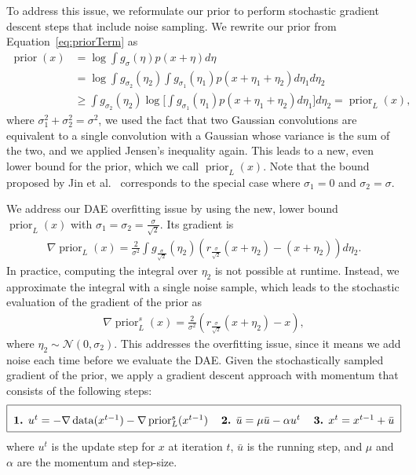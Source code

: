 \documentclass{article}
\DeclareMathOperator*{\data}{data}
\DeclareMathOperator*{\prior}{prior}
\begin{document}
To address this issue, we reformulate our prior to perform stochastic gradient descent steps that include noise sampling. We rewrite our prior from Equation~\eqref{eq:priorTerm} as
\begin{align}
\prior(x) &= \log \int g_{\sigma}(\eta) p(x+\eta) d\eta \\
&= \log \int g_{\sigma_2}(\eta_2) \int g_{\sigma_1}(\eta_1) p(x+\eta_1+\eta_2) d\eta_1 d\eta_2 \\
&\geq \int g_{\sigma_2}(\eta_2) \log \Bigg[ \int g_{\sigma_1}(\eta_1) p(x+\eta_1+\eta_2) d\eta_1 \Bigg] d\eta_2 = {\prior}_L(x),
\end{align}
where $\sigma_1^2 + \sigma_2^2 = \sigma^2$, we used the fact that two Gaussian convolutions are equivalent to a single convolution with a Gaussian whose variance is the sum of the two, and we applied Jensen's inequality again. This leads to a new, even lower bound for the prior, which we call $\prior_L(x)$. Note that the bound proposed by Jin et al.~\cite{Jin:2017:NBD} corresponds to the special case where $\sigma_1=0$ and $\sigma_2=\sigma$.

We address our DAE overfitting issue by using the new, lower bound $\prior_L(x)$ with $\sigma_1=\sigma_2=\frac{\sigma}{\sqrt{2}}$. Its gradient is
\begin{align}
\nabla {\prior}_L(x)  
= \frac{2}{\sigma^2} \int g_{\frac{\sigma}{\sqrt{2}}}(\eta_2) \left(r_{\frac{\sigma}{\sqrt{2}}}(x+\eta_2)-(x+\eta_2)\right) d\eta_2.
\end{align}
In practice, computing the integral over $\eta_2$ is not possible at runtime. Instead, we approximate the integral with a single noise sample, which leads to the stochastic evaluation of the gradient of the prior as
\begin{align}
\nabla {\prior}_L^s(x) = \frac{2}{\sigma^2} \left( r_{\frac{\sigma}{\sqrt{2}}}(x + \eta_{2}) - x \right),
\end{align}
where $\eta_2 \sim \mathcal{N}(0,\sigma_2)$. This addresses the overfitting issue, since it means we add noise each time before we evaluate the DAE. Given the stochastically sampled gradient of the prior, we apply a gradient descent approach with momentum that consists of the following steps:
\begin{align}
\renewcommand{\arraystretch}{2}
\begin{tabular}[c]{|lll|}
\hline
\textbf{1.} $u^{t} = -\nabla \data(x^{t-1}) - \nabla \prior_L^{s}(x^{t-1})$ &
\textbf{2.} $\bar{u} = \mu \bar{u} - \alpha u^{t}$ &
\textbf{3.} $x^{t} = x^{t-1} + \bar{u}$ 
\\
\hline
\end{tabular}
\renewcommand{\arraystretch}{1}
\end{align}
where $u^t$ is the update step for $x$ at iteration $t$, $\bar{u}$ is the running step, and $\mu$ and $\alpha$ are the momentum and step-size.
\end{document}
